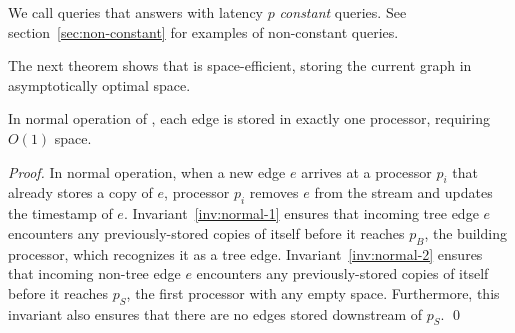 We call queries that \XSCC answers with latency $p$ \emph{constant} queries.
See section~\ref{sec:non-constant} for examples of non-constant queries.

The next theorem shows that \XSCC is space-efficient, storing the current graph in asymptotically optimal space.
\begin{theorem}
\label{thm:non-dup}
In normal operation of \XSCCns, each edge is stored in exactly one processor,
requiring $O(1)$ space.
\end{theorem}
\begin{proof}
In normal operation, when a new edge $e$ arrives at a processor $p_i$ that
already stores a copy of $e$, processor $p_i$ removes $e$ from the stream and
updates the timestamp of $e$.
Invariant~\ref{inv:normal-1} ensures that incoming tree edge $e$ encounters any
previously-stored copies of itself before it reaches $p_B$, the building
processor, which recognizes it as a tree edge.
Invariant~\ref{inv:normal-2} ensures that incoming non-tree edge $e$
encounters any previously-stored copies of itself before it reaches $p_S$,
the first processor with any empty space. Furthermore, this invariant also
ensures that there are no edges stored downstream of $p_S$.  
\qed
\end{proof}

\iffalse
Case (I): there are no transit edges in the system. Then neither
the building processor designation $p_B$ nor the logical graph $G(t)$ change between query
entry time $t$ and time $t+B$ (when the query arrives at the builder).
By Lemma~\ref{lemma:wx-correspondence}, $u$ and $v$ are connected iff
$R_{p_B}(u) = R_{p_B}(v)$.  Further relabeling does not change this result, and the correct
answer will propagate to the I/O processor at tick $t+P$.
Case (II): there are transit edges in the system at X-Stream tick $t$.  We must argue that
any transit edges that affect connectivity have time to settle (a prerequisite for
invoking Lemma~\ref{lemma:wx-correspondence}) before the query arrives at the building processor.
Noting that the building processor might advance as the query propagates, let $B'$ be
the index of the current builder at time the query arrives there.
Since the
storage capacity $s$ always exceeds $P$,  the building processor will be either $p_{B'-1}$
(if the builder designation advanced) or
$p_{B'}$ when the query reaches it.  In either case, Invariant~\ref{inv:normal-1} ensures
that no tree edge is downstream of the current builder. Therefore, any transit edge will arrive at
the builder at time $t' = t + B' - 1 \le t+B-1$.  This is at least one tick before the query
arrives.  At that point, Case (I) applies. $\qed$
\fi




